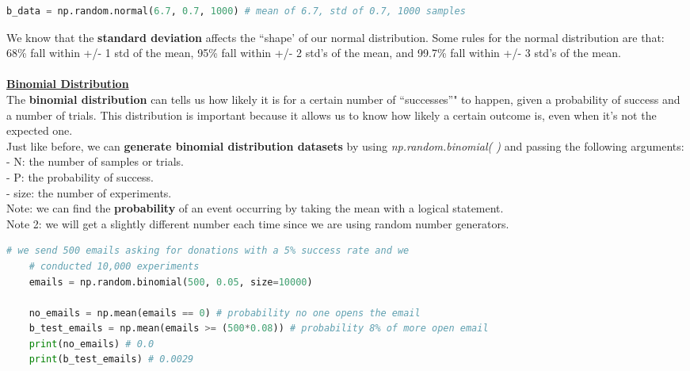 \documentclass[11pt, a4paper]{article}
\begin{document}
\begin{spacing}{1.1}
\begin{lstlisting}[language=Python]
	b_data = np.random.normal(6.7, 0.7, 1000) # mean of 6.7, std of 0.7, 1000 samples \end{lstlisting}\vspace*{1mm}
	We know that the \textbf{standard deviation} affects the ``shape' of our normal distribution. Some rules for the normal distribution are that: 68\% fall within +/- 1 std of the mean, 95\% fall within +/- 2 std's of the mean, and 99.7\% fall within +/- 3 std's of the mean. \\~\\
	\underline{\textbf{Binomial Distribution}} \\
	The \textbf{binomial distribution} can tells us how likely it is for a certain number of ``successes”" to happen, given a probability of success and a number of trials. This distribution is important because it allows us to know how likely a certain outcome is, even when it’s not the expected one. \vspace*{1mm} \\
	Just like before, we can \textbf{generate binomial distribution datasets} by using \textit{np.random.binomial( )} and passing the following arguments: \\
	\hspace*{3mm} - N: the number of samples or trials. \\
	\hspace*{3mm} - P: the probability of success. \\
	\hspace*{3mm} - size: the number of experiments. \\
	Note: we can find the \textbf{probability} of an event occurring by taking the mean with a logical statement. \\
	Note 2: we will get a slightly different number each time since we are using random number generators.
	\begin{lstlisting}[language=Python]
	# we send 500 emails asking for donations with a 5% success rate and we 
	# conducted 10,000 experiments
	emails = np.random.binomial(500, 0.05, size=10000) 
	
	no_emails = np.mean(emails == 0) # probability no one opens the email
	b_test_emails = np.mean(emails >= (500*0.08)) # probability 8% of more open email
	print(no_emails) # 0.0
	print(b_test_emails) # 0.0029 \end{lstlisting}\vspace*{4mm}
	

\end{spacing}
\end{document}
